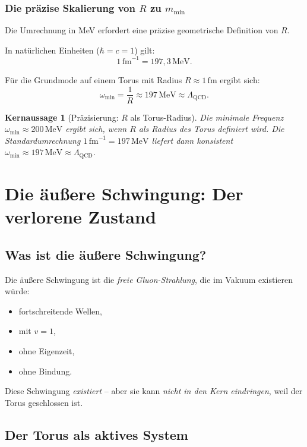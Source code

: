 \documentclass[11pt,a4paper]{article}
\newtheorem{keyresult}{Kernaussage}
\begin{document}
	\subsubsection{Die präzise Skalierung von \(R\) zu \(m_{\min}\)}
	
	Die Umrechnung in MeV erfordert eine präzise geometrische Definition von \(R\).
	
	In natürlichen Einheiten (\(\hbar = c = 1\)) gilt:
	\[
	1\,\text{fm}^{-1} = 197{,}3\,\text{MeV}.
	\]
	
	Für die Grundmode auf einem Torus mit Radius \(R \approx 1\,\text{fm}\) ergibt sich:
	\[
	\omega_{\min} = \frac{1}{R} \approx 197\,\text{MeV} \approx \Lambda_{\text{QCD}}.
	\]
	
	\begin{keyresult}[Präzisierung: \(R\) als Torus-Radius]
		Die minimale Frequenz \(\omega_{\min} \approx 200\,\text{MeV}\) ergibt sich, wenn \(R\) als \emph{Radius} des Torus definiert wird. 
		Die Standardumrechnung \(1\,\text{fm}^{-1} = 197\,\text{MeV}\) liefert dann konsistent \(\omega_{\min} \approx 197\,\text{MeV} \approx \Lambda_{\text{QCD}}\).
	\end{keyresult}
	
	\section{Die äußere Schwingung: Der verlorene Zustand}
	
	\subsection{Was ist die äußere Schwingung?}
	
	Die äußere Schwingung ist die \emph{freie Gluon-Strahlung}, die im Vakuum existieren würde:
	\begin{itemize}
		\item fortschreitende Wellen,
		\item mit \(v = 1\),
		\item ohne Eigenzeit,
		\item ohne Bindung.
	\end{itemize}
	
	Diese Schwingung \emph{existiert} -- aber sie kann \emph{nicht in den Kern eindringen}, weil der Torus geschlossen ist.
	
	\subsection{Der Torus als aktives System}
	
\end{document}
